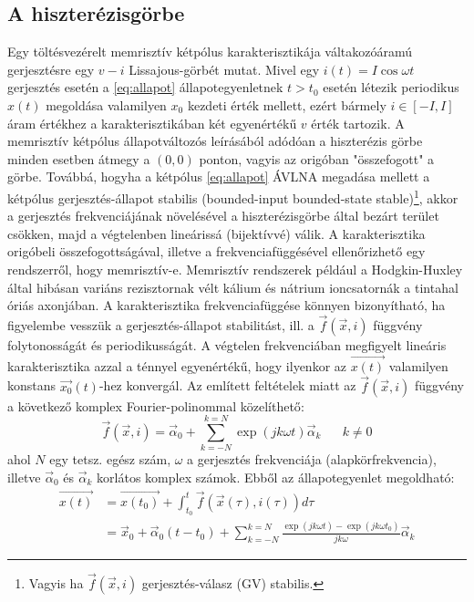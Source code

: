 \documentclass[twoside]{article}
\begin{document}
  \subsection{A hiszterézisgörbe}\label{sec:hysteresis}
  Egy töltésvezérelt memrisztív kétpólus karakterisztikája váltakozóáramú gerjesztésre egy $v-i$ Lissajous-görbét mutat. Mivel egy $i(t) = I \cos\omega t$ gerjesztés esetén a \eqref{eq:allapot} állapotegyenletnek $t > t_0$ esetén létezik periodikus $x(t)$ megoldása valamilyen $x_0$ kezdeti érték mellett, ezért bármely $i\in [-I, I]$ áram értékhez a karakterisztikában két egyenértékű $v$ érték tartozik\cite{chuakang1976}. A memrisztív kétpólus állapotváltozós leírásából adódóan a hiszterézis görbe minden esetben átmegy a $(0,0)$ ponton, vagyis az origóban "összefogott" a görbe. Továbbá, hogyha a kétpólus \eqref{eq:allapot} ÁVLNA megadása mellett a kétpólus gerjesztés-állapot stabilis (bounded-input bounded-state stable\cite{chuakang1976})\footnote{Vagyis ha $\vec{f}(\vec{x}, i)$ gerjesztés-válasz (GV) stabilis.}, akkor a gerjesztés frekvenciájának növelésével a hiszterézisgörbe által bezárt terület csökken, majd a végtelenben lineárissá (bijektívvé) válik. A karakterisztika origóbeli összefogottságával, illetve a frekvenciafüggésével ellenőrizhető egy rendszerről, hogy memrisztív-e\cite{chuathefourth}. Memrisztív rendszerek például a Hodgkin-Huxley által hibásan variáns rezisztornak vélt kálium és nátrium ioncsatornák a tintahal óriás axonjában\cite{chua2014}. A karakterisztika frekvenciafüggése könnyen bizonyítható, ha figyelembe vesszük a gerjesztés-állapot stabilitást, ill. a $\vec{f}(\vec{x}, i)$ függvény folytonosságát és periodikusságát. A végtelen frekvenciában megfigyelt lineáris karakterisztika azzal a ténnyel egyenértékű, hogy ilyenkor az $\vec{x(t)}$ valamilyen konstans $\vec{x_0}(t)$-hez konvergál. Az említett feltételek miatt az $\vec{f}(\vec{x}, i)$ függvény a következő komplex Fourier-polinommal közelíthető\cite{chuakang1976}:
  \begin{equation}
  	\vec{f}(\vec{x}, i) = \vec{\alpha}_0 + \sum_{k = -N} ^ {k = N}\exp(jk\omega t)\vec{\alpha}_k		\;\;\;\;\;\; k \neq 0
  \end{equation}
  ahol $N$ egy tetsz. egész szám, $\omega$ a gerjesztés frekvenciája (alapkörfrekvencia), illetve $\vec{\alpha}_0$ és $\vec{\alpha}_k$ korlátos komplex számok. Ebből az állapotegyenlet megoldható:
  \begin{equation}
  	\begin{aligned}
  		\vec{x(t)} &= \vec{x(t_0)} + \int_{t_0}^t \vec{f}(\vec{x}(\tau), i(\tau))d\tau \\
  		&= \vec{x}_0 + \vec{\alpha}_0 (t-t_0) + \sum_{k = -N}^{k = N} \frac{\exp(jk\omega t) - \exp(jk\omega t_0)}{jk\omega}\vec{\alpha}_k
  	\end{aligned}
  \end{equation}
\end{document}
